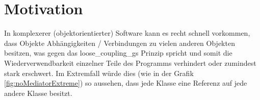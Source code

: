 
\chapter{Motivation}\label{ref:motivation}
In komplexerer (objektorientierter) Software kann es recht schnell vorkommen, dass Objekte Abhängigkeiten / Verbindungen zu vielen anderen Objekten besitzen, was gegen das \glspl{loose_coupling_g} Prinzip spricht und somit die Wiederverwendbarkeit einzelner Teile des Programms verhindert oder zumindest stark erschwert. Im Extremfall würde dies (wie in der Grafik \ref{fig:noMediatorExtreme}) so aussehen, dass jede Klasse eine Referenz auf jede andere Klasse besitzt.
\autocite[vgl.][S. 273ff]{gangoffour_book}
